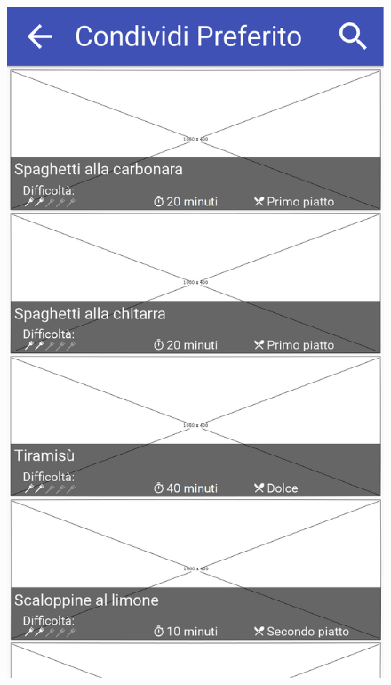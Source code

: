 \begin{figure}[H]
	\begin{minipage}{.49\textwidth}
		\includegraphics[width=\textwidth]{img/wireframe/preferiti_condividi_ricetta.png}
	\end{minipage}
	\begin{minipage}{.49\textwidth}

\end{minipage}
\end{figure}
